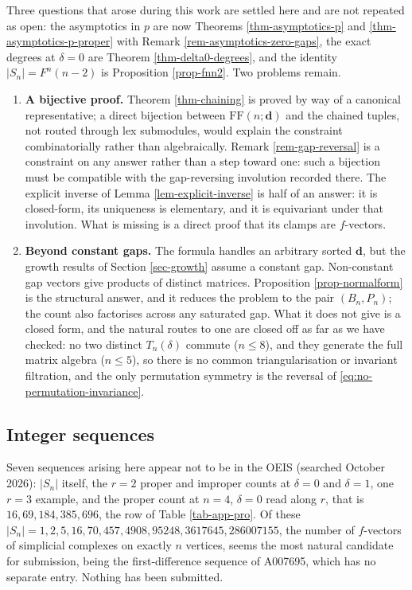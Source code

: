 \documentclass[11pt, a4paper, abstract=yes]{scrartcl}
\theoremstyle{definition}
\theoremstyle{remark}
\theoremstyle{plain}
\newcommand{\vek}[1]{\boldsymbol{#1}}
\begin{document}
Three questions that arose during this work are settled here and are not repeated as open: the
asymptotics in \(p\) are now Theorems \ref{thm-asymptotics-p}
and \ref{thm-asymptotics-p-proper} with Remark \ref{rem-asymptotics-zero-gaps}, the exact degrees at
\(\delta=0\) are Theorem \ref{thm-delta0-degrees}, and the identity \(\lvert S_n\rvert=F^n(n-2)\)
is Proposition \ref{prop-fnn2}. Two problems remain.

\begin{enumerate}
\item \textbf{A bijective proof.} Theorem \ref{thm-chaining} is proved by way of a canonical representative;
a direct bijection between \(\mathrm{FF}(n;\vek d)\) and the chained tuples, not routed through lex
submodules, would explain the constraint combinatorially rather than algebraically. Remark
\ref{rem-gap-reversal} is a constraint on any answer rather than a step toward one: such a
bijection must be compatible with the gap-reversing involution recorded there. The explicit
inverse of Lemma \ref{lem-explicit-inverse} is half of an answer: it is closed-form, its
uniqueness is elementary, and it is equivariant under that involution. What is missing is a
direct proof that its clamps are \(f\)-vectors.
\item \textbf{Beyond constant gaps.} The formula handles an arbitrary sorted \(\vek d\), but the growth results of
Section \ref{sec-growth} assume a constant gap. Non-constant gap vectors give products of distinct
matrices. Proposition \ref{prop-normalform} is the structural answer, and it reduces the problem
to the pair \((B_n,P_n)\); the count also factorises across any saturated gap. What it does not give
is a closed form, and the natural routes to one are closed off as far as we have checked: no two
distinct \(T_n(\delta)\) commute (\(n\le8\)), and they generate the full matrix algebra
(\(n\le5\)), so there is no common triangularisation or invariant filtration, and the only permutation symmetry is the reversal of
\eqref{eq:no-permutation-invariance}.
\end{enumerate}
\subsection{Integer sequences}
\label{sec:orgd94351a}

Seven sequences arising here appear not to be in the OEIS (searched October 2026): \(|S_n|\) itself, the \(r=2\)
proper and improper counts at \(\delta=0\) and \(\delta=1\), one \(r=3\) example, and the proper
count at \(n=4\), \(\delta=0\) read along \(r\), that is \(16,69,184,385,696\), the row of
Table \ref{tab-app-pro}. Of
these \(|S_n|=1,2,5,16,70,457,4908,95248,3617645,286007155\), the number of \(f\)-vectors of
simplicial complexes on exactly \(n\) vertices, seems the most natural candidate for submission,
being the first-difference sequence of A007695, which has no separate entry. Nothing has been
submitted.
\end{document}
